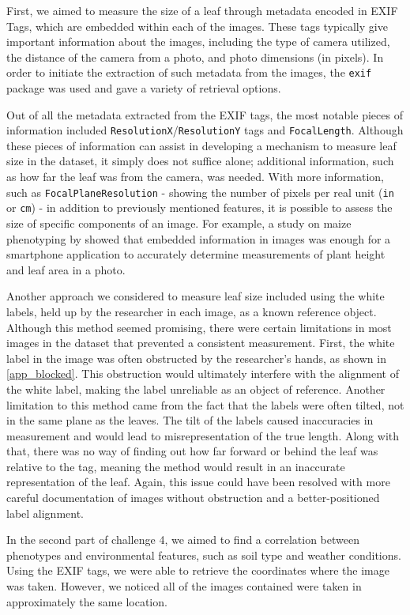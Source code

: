 \documentclass[final,5p,times,twocolumn,authoryear]{elsarticle}
\begin{document}
First, we aimed to measure the size of a leaf through metadata encoded in EXIF Tags, which are embedded within each of the images. These tags typically give important information about the images, including the type of camera utilized, the distance of the camera from a photo, and photo dimensions (in pixels). In order to initiate the extraction of such metadata from the images, the \verb|exif| package was used and gave a variety of retrieval options. 

Out of all the metadata extracted from the EXIF tags, the most notable pieces of information included \verb|ResolutionX|/\verb|ResolutionY| tags and \verb|FocalLength|. Although these pieces of information can assist in developing a mechanism to measure leaf size in the dataset, it simply does not suffice alone; additional information, such as how far the leaf was from the camera, was needed. With more information, such as \verb|FocalPlaneResolution| - showing the number of pixels per real unit (\verb|in| or \verb|cm|) - in addition to previously mentioned features, it is possible to assess the size of specific components of an image. For example, a study on maize phenotyping by \cite{liu2021pocketmaize} showed that embedded information in images was enough for a smartphone application to accurately determine measurements of plant height and leaf area in a photo.

Another approach we considered to measure leaf size included using the white labels, held up by the researcher in each image, as a known reference object. Although this method seemed promising, there were certain limitations in most images in the dataset that prevented a consistent measurement. First, the white label in the image was often obstructed by the researcher’s hands, as shown in \ref{app_blocked}. This obstruction would ultimately interfere with the alignment of the white label, making the label unreliable as an object of reference. Another limitation to this method came from the fact that the labels were often tilted, not in the same plane as the leaves. The tilt of the labels caused inaccuracies in measurement and would lead to misrepresentation of the true length. Along with that, there was no way of finding out how far forward or behind the leaf was relative to the tag, meaning the method would result in an inaccurate representation of the leaf. Again, this issue could have been resolved with more careful documentation of images without obstruction and a better-positioned label alignment.

In the second part of challenge 4, we aimed to find a correlation between phenotypes and environmental features, such as soil type and weather conditions. Using the EXIF tags, we were able to retrieve the coordinates where the image was taken. However, we noticed all of the images contained were taken in approximately the same location.
\end{document}
